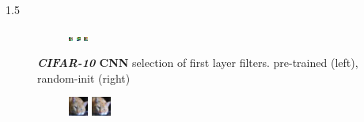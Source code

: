 \documentclass[final]{beamer}
\newlength{\onecolwid}
\newlength{\threecolwid}
\begin{document}
\begin{frame}[t]
\begin{columns}[t]
\begin{column}{\threecolwid}
\begin{alertblock}
\begin{columns}[t]
\begin{column}{1.5\onecolwid}
\begin{figure}
\begin{subfigure}{.4\linewidth}
					\includegraphics[width=0.1\linewidth]{../graphics/cifar_filters/random_16.png} %
					\includegraphics[width=0.1\linewidth]{../graphics/cifar_filters/random_17.png} %
					\includegraphics[width=0.1\linewidth]{../graphics/cifar_filters/random_18.png}
				\end{subfigure}

			\caption{\textbf{\emph{CIFAR-10} CNN} selection of first layer filters. pre-trained (left), random-init (right)}
			\label{fig:cifar_filters}

			\end{figure}

			\begin{figure}

				\begin{subfigure}{0.4\linewidth}

					\centering
					\includegraphics[width=0.4\linewidth]{../graphics/reconstructions/cifar/relu/input_00_relu.png}
					\includegraphics[width=0.4\linewidth]{../graphics/reconstructions/cifar/relu/reconstruction_00_relu.png}


\end{subfigure}
\end{figure}
\end{column}
\end{columns}
\end{alertblock}
\end{column}
\end{columns}
\end{frame}
\end{document}
